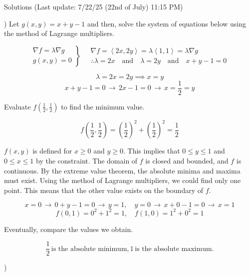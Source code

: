 \documentclass{article}
\begin{document}
\newpage

\begin{center}
Solutions (Last update: 7/22/25 (22nd of July) 11:15 PM)
\end{center}

) Let $g(x,y)=x+y-1$ and then, solve the system of equations below using the method of Lagrange multipliers.

\[
\left.
\begin{array}{ll}
\displaystyle\nabla f =\lambda \nabla g \\
\displaystyle g(x,y) = 0
\end{array}
\right\}\quad
\begin{array}{ll}
\nabla f = \left\langle 2x, 2y\right\rangle = \lambda\left\langle1,1\right\rangle = \lambda\nabla g\\\therefore\displaystyle \lambda = 2x\quad \text{and}\quad \lambda = 2y\quad \text{and}\quad x+y-1=0
\end{array}
\]

\[\lambda=2x=2y\implies x=y\]
\[x+y-1=0 \,\rightarrow\, 2x-1 = 0\,\rightarrow\,x=\frac12=y\]

\hfill

\noindent Evaluate $\displaystyle f\left(\frac12,\frac12\right)$ to find the minimum value.

\[f\left(\frac12,\frac12\right)=\left(\frac12\right)^2+\left(\frac12\right)^2=\frac12\]

\hfill

\noindent $f(x,y)$ is defined for $x\geq0$ and $y\geq0$. This implies that $0\leq y \leq1$ and $0\leq x\leq1$ by the constraint. The domain of $f$ is closed and bounded, and $f$ is continuous. By the extreme value theorem, the absolute minima and maxima must exist. Using the method of Lagrange multipliers, we could find only one point. This means that the other value exists on the boundary of $f$.

\[x=0\,\rightarrow\,0+y-1=0\,\rightarrow\,y=1,\quad y=0\,\rightarrow\, x+0-1=0\,\rightarrow\, x=1\]
\[f(0,1) = 0^2 +1^2 = 1,\quad f(1,0) = 1^2+0^2 = 1\]

\hfill

\noindent Eventually, compare the values we obtain.

\[\boxed{\frac12\,\text{is the absolute minimum}, 1\,\text{is the absolute maximum}.}\]

\hfill

)
\end{document}

